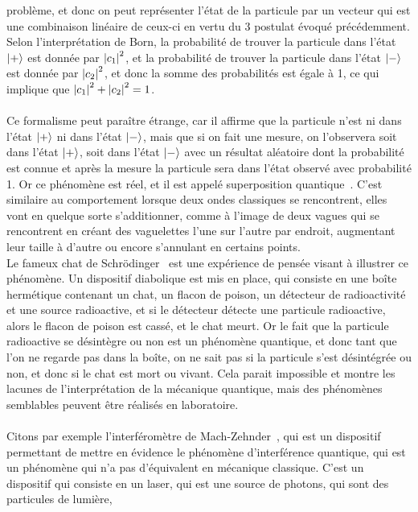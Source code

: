 problème, et donc on peut représenter l'état de la particule par un vecteur qui est une combinaison linéaire
de ceux-ci en vertu du 3\ieme{} postulat évoqué précédemment.
Selon l'interprétation de Born, la probabilité de trouver la particule dans l'état $\ket{+}$ est donnée par
$\abs{c_1}^2$, et la probabilité de trouver la particule dans l'état $\ket{-}$ est donnée par $\abs{c_2}^2$,
et donc la somme des probabilités est égale à 1, ce qui implique que $\abs{c_1}^2 + \abs{c_2}^2 = 1$.\\ \\
Ce formalisme peut paraître étrange, car il affirme que la particule n’est ni dans l’état $\ket{+}$ ni dans l’état
$\ket{-}$, mais que si on fait une mesure, on l’observera soit dans l’état $\ket{+}$, soit dans l’état $\ket{-}$ avec un résultat
aléatoire dont la probabilité est connue et après la mesure la particule sera dans l’état observé avec probabilité 1.
Or ce phénomène est réel, et il est appelé superposition quantique~\cite{wiki:superposition}.
C'est similaire au comportement lorsque deux ondes classiques se rencontrent, elles vont en quelque sorte s'additionner,
comme à l'image de deux vagues qui se rencontrent en créant des vaguelettes l'une sur l'autre par endroit, augmentant
leur taille à d'autre ou encore s'annulant en certains points.\\
Le fameux chat de Schrödinger~\cite{wiki:chat-schrodinger} est une expérience de pensée visant à illustrer ce phénomène.
Un dispositif diabolique est mis en place, qui consiste en une boîte hermétique contenant un chat, un flacon
de poison, un détecteur de radioactivité et une source radioactive, et si le détecteur détecte une particule
radioactive, alors le flacon de poison est cassé, et le chat meurt.
Or le fait que la particule radioactive se désintègre ou non est un phénomène quantique, et donc tant que l'on ne
regarde pas dans la boîte, on ne sait pas si la particule s'est désintégrée ou non, et donc si le chat est mort
ou vivant.
Cela parait impossible et montre les lacunes de l'interprétation de la mécanique quantique, mais des phénomènes
semblables peuvent être réalisés en laboratoire.\\ \\
Citons par exemple l'interféromètre de Mach-Zehnder~\cite{wiki:exp-superposition}, qui est un dispositif permettant de mettre en évidence
le phénomène d'interférence quantique, qui est un phénomène qui n'a pas d'équivalent en mécanique classique.
C'est un dispositif qui consiste en un laser, qui est une source de photons, qui sont des particules de lumière,
